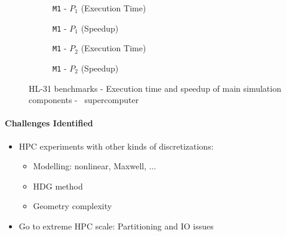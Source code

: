 {\begin{figure}[!ht]
{
    }

    \begin{subfigure}[c]{0.49\textwidth}
      \centering
      \caption{\texttt{M1} - \texttt{$P_1$} (Execution Time)}
    \end{subfigure}
    \hfill
    \begin{subfigure}[c]{0.49\textwidth}
      \centering
      \caption{\texttt{M1} - \texttt{$P_1$} (Speedup)}
    \end{subfigure}

    \vspace*{0.04\textwidth}

    \begin{subfigure}[c]{0.49\textwidth}
      \centering
      \caption{\texttt{M1} - \texttt{$P_2$} (Execution Time)}
    \end{subfigure}
    \hfill
    \begin{subfigure}[c]{0.49\textwidth}
      \centering
      \caption{\texttt{M1} - \texttt{$P_2$} (Speedup)}
    \end{subfigure}

    \caption{HL-31 benchmarks - Execution time and speedup of main simulation components
      - \supercomputerName \  supercomputer}
    \label{fig:spec:app-feelpp:hl-31:results:performance_times_M1_\supercomputerFile}
  \end{figure}
}


\paragraph{Challenges Identified}

\begin{itemize}
\item HPC experiments with other kinds of discretizations:
  \begin{itemize}
  \item Modelling: nonlinear, Maxwell, ...
  \item HDG method
  \item Geometry complexity
  \end{itemize}
\item Go to extreme HPC scale: Partitioning and IO issues
\end{itemize}
